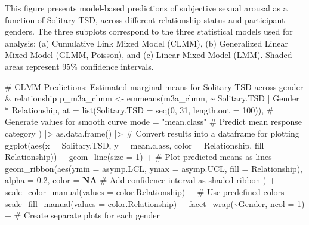 \documentclass[
  bookmarksnumbered]{article}
\newenvironment{Shaded}{\begin{snugshade}}{\end{snugshade}}
\newcommand{\AttributeTok}[1]{\textcolor[rgb]{0.80,0.80,0.80}{#1}}
\newcommand{\CommentTok}[1]{\textcolor[rgb]{0.50,0.62,0.50}{#1}}
\newcommand{\ConstantTok}[1]{\textcolor[rgb]{0.86,0.64,0.64}{\textbf{#1}}}
\newcommand{\DecValTok}[1]{\textcolor[rgb]{0.86,0.86,0.80}{#1}}
\newcommand{\FloatTok}[1]{\textcolor[rgb]{0.75,0.75,0.82}{#1}}
\newcommand{\FunctionTok}[1]{\textcolor[rgb]{0.94,0.94,0.56}{#1}}
\newcommand{\NormalTok}[1]{\textcolor[rgb]{0.80,0.80,0.80}{#1}}
\newcommand{\OtherTok}[1]{\textcolor[rgb]{0.94,0.94,0.56}{#1}}
\newcommand{\SpecialCharTok}[1]{\textcolor[rgb]{0.86,0.64,0.64}{#1}}
\newcommand{\StringTok}[1]{\textcolor[rgb]{0.80,0.58,0.58}{#1}}
\begin{document}
This figure presents model-based predictions of subjective sexual arousal as a function of Solitary TSD, across different relationship status and participant genders. The three subplots correspond to the three statistical models used for analysis: (a) Cumulative Link Mixed Model (CLMM), (b) Generalized Linear Mixed Model (GLMM, Poisson), and (c) Linear Mixed Model (LMM). Shaded areas represent 95\% confidence intervals.

\begin{Shaded}
\begin{Highlighting}[]
\CommentTok{\# CLMM Predictions: Estimated marginal means for Solitary TSD across gender \& relationship}
\NormalTok{p\_m3a\_clmm }\OtherTok{\textless{}{-}} \FunctionTok{emmeans}\NormalTok{(m3a\_clmm, }\SpecialCharTok{\textasciitilde{}}\NormalTok{ Solitary.TSD }\SpecialCharTok{|}\NormalTok{ Gender }\SpecialCharTok{*}\NormalTok{ Relationship,}
  \AttributeTok{at =} \FunctionTok{list}\NormalTok{(}\AttributeTok{Solitary.TSD =} \FunctionTok{seq}\NormalTok{(}\DecValTok{0}\NormalTok{, }\DecValTok{31}\NormalTok{, }\AttributeTok{length.out =} \DecValTok{100}\NormalTok{)), }\CommentTok{\# Generate values for smooth curve}
  \AttributeTok{mode =} \StringTok{"mean.class"} \CommentTok{\# Predict mean response category}
\NormalTok{) }\SpecialCharTok{|\textgreater{}}
  \FunctionTok{as.data.frame}\NormalTok{() }\SpecialCharTok{|\textgreater{}} \CommentTok{\# Convert results into a dataframe for plotting}
  \FunctionTok{ggplot}\NormalTok{(}\FunctionTok{aes}\NormalTok{(}\AttributeTok{x =}\NormalTok{ Solitary.TSD, }\AttributeTok{y =}\NormalTok{ mean.class, }\AttributeTok{color =}\NormalTok{ Relationship, }\AttributeTok{fill =}\NormalTok{ Relationship)) }\SpecialCharTok{+}
  \FunctionTok{geom\_line}\NormalTok{(}\AttributeTok{size =} \DecValTok{1}\NormalTok{) }\SpecialCharTok{+} \CommentTok{\# Plot predicted means as lines}
  \FunctionTok{geom\_ribbon}\NormalTok{(}\FunctionTok{aes}\NormalTok{(}\AttributeTok{ymin =}\NormalTok{ asymp.LCL, }\AttributeTok{ymax =}\NormalTok{ asymp.UCL, }\AttributeTok{fill =}\NormalTok{ Relationship),}
    \AttributeTok{alpha =} \FloatTok{0.2}\NormalTok{, }\AttributeTok{color =} \ConstantTok{NA} \CommentTok{\# Add confidence interval as shaded ribbon}
\NormalTok{  ) }\SpecialCharTok{+}
  \FunctionTok{scale\_color\_manual}\NormalTok{(}\AttributeTok{values =}\NormalTok{ color.Relationship) }\SpecialCharTok{+} \CommentTok{\# Use predefined colors}
  \FunctionTok{scale\_fill\_manual}\NormalTok{(}\AttributeTok{values =}\NormalTok{ color.Relationship) }\SpecialCharTok{+}
  \FunctionTok{facet\_wrap}\NormalTok{(}\SpecialCharTok{\textasciitilde{}}\NormalTok{Gender, }\AttributeTok{ncol =} \DecValTok{1}\NormalTok{) }\SpecialCharTok{+} \CommentTok{\# Create separate plots for each gender}

\end{Highlighting}
\end{Shaded}
\end{document}

